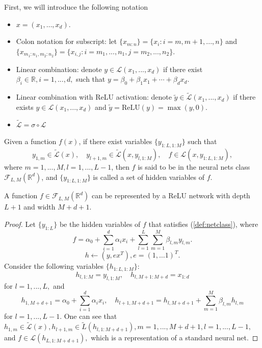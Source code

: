 First, we will introduce the following notation
\begin{itemize}
\item $x=(x_1,\ldots,x_d)$.
\item Colon notation for subscript: let $\{x_{m:n}\} = \{x_i:i = m,m+1,...,n\}$ and $\{x_{m_1:n_1,m_2:n_2}\}= \{x_{i,j}:i = m_1,...,n_1,j = m_2,...,n_2\}.$ 
\item Linear combination: denote $y\in \mathcal L(x_1,...,x_d)$ if
  there exist $\beta_i\in \mathbb{R},i=1,...,d,$ such that $y =
  \beta_0+\beta_1x_1+\cdots+\beta_d x_d$.
\item Linear combination with ReLU activation: denote $\tilde{y}\in
  \tilde{\mathcal L}(x_1,...,x_d)$ if there exists $y\in
  \mathcal{L}(x_1,...,x_d)$ and $\tilde{y} = \mbox{ReLU}(y) =
  \max(y,0).$
\item $\tilde {\mathcal L} =\sigma\circ\mathcal L$
\end{itemize}
\begin{definition}
Given a function $f(x)$, if there exist variables $\{y_{1:L,1:M}\}$ such that 
\begin{equation}
y_{1,m}\in \tilde{\mathcal L}(x),\quad y_{l+1,m} \in \tilde{\mathcal L}(x,y_{l,1:M}),\quad f\in\mathcal{L}(x,y_{1:L,1:M}),
\end{equation}\label{def:netclass}
where $m=1,...,M,l=1,...,L-1$, then $f$ is said to be in the neural nets class $\mathcal{F}_{L,M}(\mathbb{R}^d)$, and $\{y_{1:L,1:M}\}$ is called a set of hidden variables of $f$. 
\end{definition}
\newpage
\begin{proposition}
A function $f\in \mathcal F_{L,M}(\mathbb R^d)$ can be represented by a ReLU network with depth $L+1$ and width $M+d+1$.
\end{proposition}
\begin{proof}
Let $\{y_{1:L}\}$ be the hidden variables of $f$ that satisfies (\ref{def:netclass}), where
$$
f = \alpha_0 + \sum_{i=1}^d \alpha_ix_i+\sum_{l=1}^L\sum_{m=1}^M \beta_{l,m}y_{l,m}.
$$
$$
h\leftarrow (y,ex^T), e=(1,\ldots 1)^T.
$$
Consider the following variables $\{h_{1:L,1:M}\}$:
$$
h_{l,1:M} = y_{l,1:M}, \quad h_{l,M+1:M+d} = x_{1:d}
$$
for $l = 1,...,L,$ and
$$
h_{1,M+d+1} = \alpha_0 + \sum_{i=1}^d\alpha_ix_i,\quad h_{l+1,M+d+1} =h_{l,M+d+1} + \sum_{m=1}^M\beta_{l,m}h_{l,m}
$$
for $l=1,...,L-1$. One can see that $h_{1,m}\in \tilde{\mathcal L}(x),h_{l+1,m}\in \tilde{L}(h_{l,1:M+d+1}),m = 1,...,M+d+1,l = 1,...,L-1,$ and $f\in \mathcal{L}(h_{L,1:M+d+1}),$ which is a representation of a standard neural net.
\end{proof}

